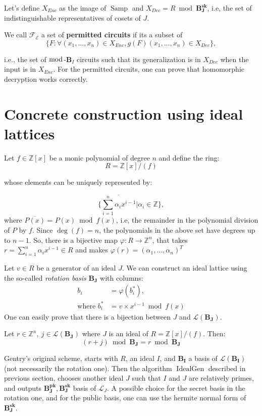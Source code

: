 Let's define $X_{Enc}$ as the image of $\operatorname{Samp}$ and $X_{Dec}=R\bmod\mathbf{B_J^{sk}}$, i.e, the set of indistinguishable representatives of cosets of $J$.

We call $\mathcal{F_E}$ a set of \textbf{permitted circuits} if its a subset of
$$\{F:\forall (x_1,\ldots,x_n)\in X_{Enc}, g(F)(x_1,\ldots,x_n)\in X_{Dec}\},$$

i.e., the set of $\bmod$-$\mathbf B_I$ circuits such that its generalization is in $X_{Dec}$ when the input is in $X_{Enc}$. For the permitted circuits, one can prove that homomorphic decryption works correctly.

\section{Concrete construction using ideal lattices}

Let $f\in\mathbb{Z}[x]$ be a monic polynomial of degree $n$ and define the ring:
$$R=\mathbb{Z}[x]/(f)$$

whose elements can be uniquely represented by:

$$\Big\{\overline{\displaystyle\sum_{i=1}^{n}\alpha_ix^{i-1}}|\alpha_i\in\mathbb Z\Big\},$$
where $\overline{P(x)}=P(x)\bmod f(x)$, i.e, the remainder in the polynomial division of $P$ by $f$. Since $\deg(f)=n$, the polynomials in the above set have degrees up to $n-1$. So, there is a bijective map $\varphi:R\to\mathbb{Z}^n$, that takes $r=\sum_{i=1}^{n}\alpha_ix^{i-1}\in R$ and makes $\varphi(r)=(\alpha_1,\ldots,\alpha_n)^T$

Let $v\in R$ be a generator of an ideal $J$. We can construct an ideal lattice using the so-called \textit{rotation basis} $\mathbf{B_J}$ with columns: 
\begin{align*}
    b_i&=\varphi(b_i^*),\\ 
    \text{where } b_i^*&=v\times x^{i-1}\bmod f(x)
\end{align*}
One can easily prove that there is a bijection between $J$ and $\mathcal{L}(\mathbf{B_J})$.
\begin{lemma}
\label{reduction}
Let $r\in\mathbb{Z}^n,~j\in\mathcal{L}(\mathbf{B_J})$ where $J$ is an ideal of $R=\mathbb{Z}[x]/(f)$. Then:
$$(r+j)\bmod \mathbf{B_J}=r\bmod \mathbf{B_J}$$
\end{lemma}

Gentry's original scheme, starts with $R$, an ideal $I$, and $\mathbf{B_I}$ a basis of $\mathcal{L}(\mathbf{B_I})$ (not necessarily the rotation one). Then the algorithm $\operatorname{IdealGen}$ described in previous section, chooses another ideal $J$ such that $I$ and $J$ are relatively primes, and outputs $\mathbf{B_J^{pk}},\mathbf{B_J^{sk}}$ basis of $\mathcal{L}_J$. A possible choice for the secret basis in the rotation one, and for the public basis, one can use the hermite normal form of $\mathbf{B_J^{sk}}$. 

